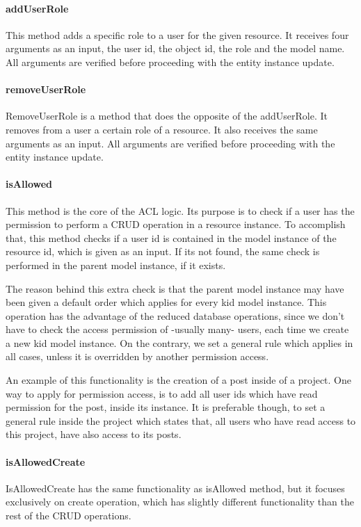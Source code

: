 \paragraph{addUserRole}
This method adds a specific role to a user for the given resource. It receives four arguments as an input, the user id, the object id, the role and the model name. All arguments are verified before proceeding with the entity instance update.
\paragraph{removeUserRole}
RemoveUserRole is a method that does the opposite of the addUserRole. It removes from a user a certain role of a resource. It also receives the same arguments as an input. All arguments are verified before proceeding with the entity instance update.
\paragraph{isAllowed}
This method is the core of the ACL logic. Its purpose is to check if  a user has the permission to perform a CRUD operation in a resource instance. To accomplish that, this method checks if a user id is contained in the model instance of the resource id, which is given as an input. If its not found, the same check is performed in the parent model instance, if it exists. \par 
	The reason behind this extra check is that the parent model instance may have been given a default order which applies for every kid model instance. This operation has the advantage of the reduced database operations, since we don't have to check the access permission of -usually many- users, each time we create a new kid model instance. On the contrary, we set a general rule which applies in all cases, unless it is overridden by another permission access. \par
	An example of this functionality is the creation of a post inside of a project. One way to apply for permission access, is to add all user ids which have read permission for the post, inside its instance. It is preferable though, to set a general rule inside the project which states that, all users who have read access to this project, have also access to its posts.

\paragraph{isAllowedCreate}
IsAllowedCreate has the same functionality as isAllowed method, but it focuses exclusively on create operation, which has slightly different functionality than the rest of the CRUD operations.

